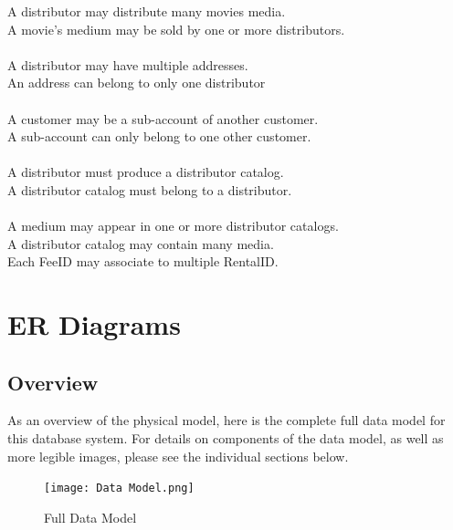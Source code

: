 \documentclass[letterpaper,12pt]{article}
\begin{document}
A distributor may distribute many movies media.\\
A movie's medium may be sold by one or more distributors.\\
\\
A distributor may have multiple addresses.\\
An address can belong to only one distributor\\
\\
A customer may be a sub-account of another customer.\\
A sub-account can only belong to one other customer.\\
\\
A distributor must produce a distributor catalog.\\
A distributor catalog must belong to a distributor.\\
\\
A medium may appear in one or more distributor catalogs.\\
A distributor catalog may contain many media.\\


Each FeeID may associate to multiple RentalID.
\section{ER Diagrams}
\subsection{Overview}
As an overview of the physical model, here is the complete full data model for this database system.  For details on components of the data model, as well as more legible images, please see the individual sections below.
\begin{figure}[H]
	\centering
	\caption{Full Data Model}
	\label{fig:Full_Data_Model}
	\texttt{[image: Data Model.png]}
\end{figure}
\end{document}
